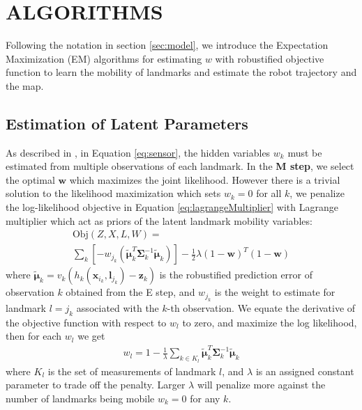 \section{ALGORITHMS}
Following the notation in section \ref{sec:model}, we introduce the Expectation Maximization (EM) algorithms for estimating $w$ with robustified objective function to learn the mobility of landmarks and estimate the robot trajectory and the map.

\subsection{Estimation of Latent Parameters}
\label{sec:traditionalEM}

As described in \cite{rogers2010slam}, in Equation \ref{eq:sensor}, the hidden variables $w_k$ must be estimated from multiple observations of each landmark. In the \textbf{M step}, we select the optimal $\boldsymbol{w}$ which maximizes the joint likelihood. However there is a trivial solution to the likelihood maximization which sets $w_k = 0$ for all $k$, we penalize the log-likelihood objective in Equation \ref{eq:lagrangeMultiplier} with Lagrange multiplier which act as priors of the latent landmark mobility variables:
\begin{multline}
\mathrm{Obj}(Z, X, L, W) = \\ \sum_k \left[ -w_{j_k}(\tilde{\boldsymbol{\mu}}^T_k\boldsymbol{\Sigma}_k^{-1}\tilde{\boldsymbol{\mu}}_k) \right] - \frac{1}{2}\lambda(1 - \boldsymbol{w})^T(1 - \boldsymbol{w})
\label{eq:lagrangeMultiplier}
\end{multline}
where $\tilde{\boldsymbol{\mu}}_k = v_k (h_k(\boldsymbol{x}_{i_k}, \boldsymbol{l}_{j_k}) - \boldsymbol{z}_k)$ is the robustified prediction error of observation $k$ obtained from the E step, and $w_{j_k}$ is the weight to estimate for landmark $l = j_k$ associated with the $k$-th observation. We equate the derivative of the objective function with respect to $w_l$ to zero, and maximize the log likelihood, then for each $w_l$ we get
\begin{equation}
\begin{aligned}
w_l = 1 - \frac{1}{\lambda} \sum_{k \in K_l}\tilde{\boldsymbol{\mu}}^T_k\boldsymbol{\Sigma}_k^{-1}\tilde{\boldsymbol{\mu}}_k
\end{aligned}
\label{eq:wk}
\end{equation}
where $K_l$ is the set of measurements of landmark $l$, and $\lambda$ is an assigned constant parameter to trade off the penalty. Larger $\lambda$ will penalize more against the number of landmarks being mobile $w_k = 0$ for any $k$.

